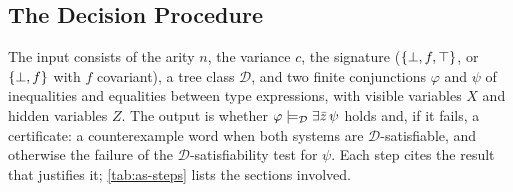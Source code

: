 \subsection{The Decision Procedure}\label{sec:as-procedure}

The input consists of the arity $n$, the variance $c$, the signature ($\{\bot,f,\top\}$,
or $\{\bot,f\}$ with $f$ covariant), a tree class $\mathcal D$, and two finite
conjunctions $\varphi$ and $\psi$ of inequalities and equalities between
type expressions, with visible variables $X$ and hidden variables $Z$. The
output is whether $\varphi\models_{\mathcal D}\exists\bar z\,\psi$ holds and, if it
fails, a certificate: a counterexample word when both systems are
$\mathcal D$-satisfiable, and otherwise the failure of the
$\mathcal D$-satisfiability test for $\psi$. Each step cites the result that
justifies it; \cref{tab:as-steps} lists the sections involved.

